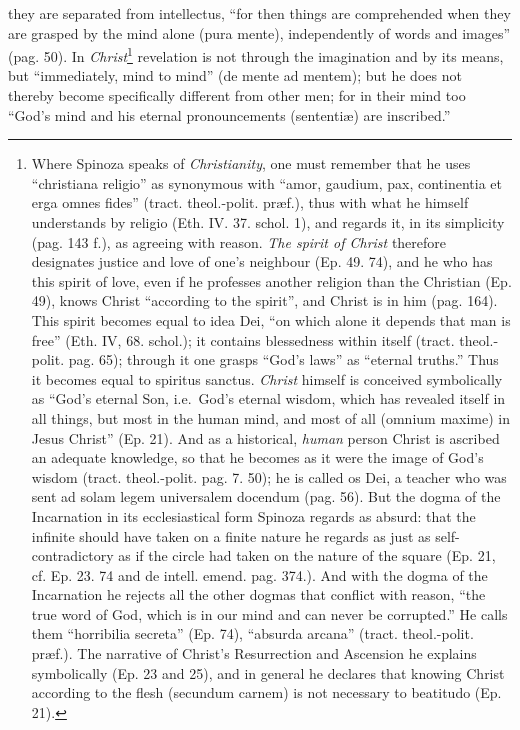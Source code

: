 \documentclass[12pt,a4paper,openany]{book}
\newcommand{\opage}[1]{\marginnote{\footnotesize\textit{[#1]}}}
\begin{document}
\opage{150}\setcounter{footnote}{0}they are separated from intellectus, ``for then things are comprehended when they are grasped by the mind alone (pura mente), independently of words and images'' (pag. 50). In \emph{Christ}\footnote{Where Spinoza speaks of \emph{Christianity}, one must remember that he uses ``christiana religio'' as synonymous with ``amor, gaudium, pax, continentia et erga omnes fides'' (tract. theol.-polit. præf.), thus with what he himself understands by religio (Eth. IV. 37. schol. 1), and regards it, in its simplicity (pag. 143 f.), as agreeing with reason. \emph{The spirit of Christ} therefore designates justice and love of one's neighbour (Ep. 49. 74), and he who has this spirit of love, even if he professes another religion than the Christian (Ep. 49), knows Christ ``according to the spirit'', and Christ is in him (pag. 164). This spirit becomes equal to idea Dei, ``on which alone it depends that man is free'' (Eth. IV, 68. schol.); it contains blessedness within itself (tract. theol.-polit. pag. 65); through it one grasps ``God's laws'' as ``eternal truths.'' Thus it becomes equal to spiritus sanctus. \emph{Christ} himself is conceived symbolically as ``God's eternal Son, i.e.\ God's eternal wisdom, which has revealed itself in all things, but most in the human mind, and most of all (omnium maxime) in Jesus Christ'' (Ep. 21). And as a historical, \emph{human} person Christ is ascribed an adequate knowledge, so that he becomes as it were the image of God's wisdom (tract. theol.-polit. pag. 7. 50); he is called os Dei, a teacher who was sent ad solam legem universalem docendum (pag. 56). But the dogma of the Incarnation in its ecclesiastical form Spinoza regards as absurd: that the infinite should have taken on a finite nature he regards as just as self-contradictory as if the circle had taken on the nature of the square (Ep. 21, cf. Ep. 23. 74 and de intell. emend. pag. 374.). And with the dogma of the Incarnation he rejects all the other dogmas that conflict with reason, ``the true word of God, which is in our mind and can never be corrupted.'' He calls them ``horribilia secreta'' (Ep. 74), ``absurda arcana'' (tract. theol.-polit. præf.). The narrative of Christ's Resurrection and Ascension he explains symbolically (Ep. 23 and 25), and in general he declares that knowing Christ according to the flesh (secundum carnem) is not necessary to beatitudo (Ep. 21).} revelation is not through the imagination and by its means, but ``immediately, mind to mind'' (de mente ad mentem); but he does not thereby become specifically different from other
\opage{151}\setcounter{footnote}{0}men; for in their mind too ``God's mind and his eternal pronouncements (sententiæ) are inscribed.''
\end{document}
